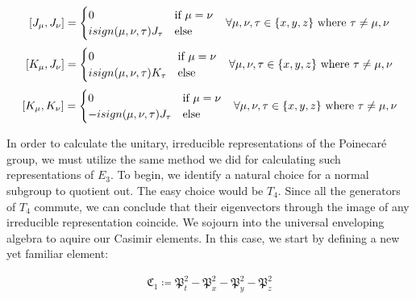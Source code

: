 \documentclass[10pt]{ucthesis}
\begin{document}
\begin{equation}
\begin{aligned}
	[J_\mu,J_\nu] = \begin{cases}
							0 &\text{if } \mu=\nu \\
							isign(\mu,\nu,\tau)J_\tau & \text{else}
						\end{cases} \hspace{3mm} \forall \mu,\nu,\tau\in\{x,y,z\}\text{ where }\tau \neq\mu,\nu
\end{aligned}
\end{equation}
\begin{equation}
\begin{aligned}
	[K_\mu,J_\nu] = \begin{cases}
							0 &\text{if } \mu=\nu \\
							isign(\mu,\nu,\tau)K_\tau & \text{else}
						\end{cases} \hspace{3mm} \forall \mu,\nu,\tau\in\{x,y,z\}\text{ where }\tau \neq\mu,\nu
\end{aligned}
\end{equation}
\begin{equation}
\begin{aligned}
	[K_\mu,K_\nu] = \begin{cases}
							0 &\text{if } \mu=\nu \\
							-isign(\mu,\nu,\tau)J_\tau & \text{else}
						\end{cases} \hspace{3mm} \forall \mu,\nu,\tau\in\{x,y,z\}\text{ where }\tau \neq\mu,\nu
\end{aligned}
\end{equation}

In order to calculate the unitary, irreducible representations of the Poinecar\'e group, we must utilize the same method we did for calculating such representations of $E_3$. To begin, we identify a natural choice for a normal subgroup to quotient out. The easy choice would be $T_4$. Since all the generators of $T_4$ commute, we can conclude that their eigenvectors through the image of any irreducible representation coincide. We sojourn into the universal enveloping algebra to aquire our Casimir elements. In this case, we start by defining a new yet familiar element:

 
\begin{equation}
\begin{aligned}
	\mathfrak{C}_1 \coloneq \mathfrak{P}_t^2 -  \mathfrak{P}_x^2 -\mathfrak{P}_y^2- \mathfrak{P}_z^2
\end{aligned}
\end{equation}
\end{document}
